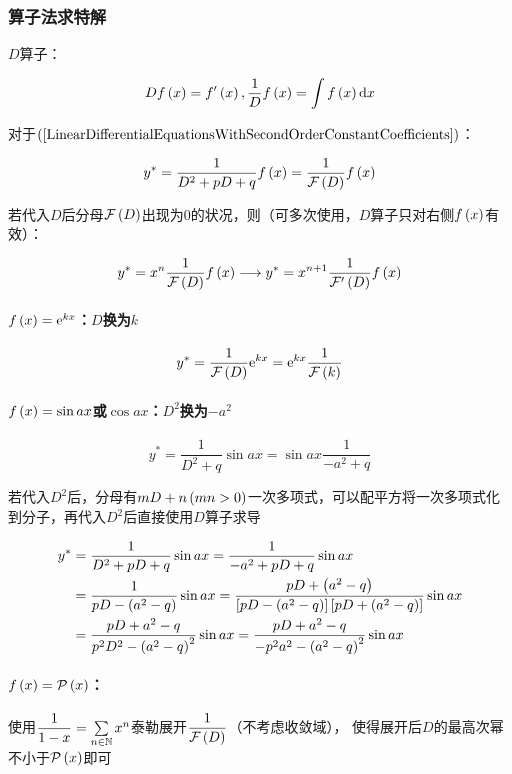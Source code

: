 \documentclass{article}
\begin{document}
\subsubsection{算子法求特解}

$D$算子：

\[Df\left(x\right)=f^\prime\left(x\right),\frac1Df\left(x\right)=\int f\left(x\right)\mathrm d x\]

对于$\left(\ref{LinearDifferentialEquationsWithSecondOrderConstantCoefficients}\right)$：

\[y^*=\frac1{D^2+pD+q}f\left(x\right)=\frac1{\mathcal F\left(D\right)}f\left(x\right)\]

若代入$D$后分母$\mathcal F\left(D\right)$出现为$0$的状况，则（可多次使用，$D$算子只对右侧$f\left(x\right)$有效）：

\[y^*=x^n\frac1{\mathcal F\left(D\right)}f\left(x\right)\longrightarrow y^*=x^{n+1}\frac1{\mathcal F^\prime\left(D\right)}f\left(x\right)\]

\paragraph{$f\left(x\right)=\mathrm e^{kx}$：$D$换为$k$}

\[y^*=\frac1{\mathcal F\left(D\right)}\mathrm e^{kx}=\mathrm e^{kx}\frac1{\mathcal F\left(k\right)}\]

\paragraph{$f\left(x\right)=\sin ax$或$\cos ax$：$D^2$换为$-a^2$}

\[y^*=\frac1{D^2+q}\sin ax=\sin ax\frac1{-a^2+q}\]

若代入$D^2$后，分母有$mD+n\left(mn>0\right)$一次多项式，可以配平方将一次多项式化到分子，再代入$D^2$后直接使用$D$算子求导

\[\begin{aligned}
        y^* & =\frac1{D^2+pD+q}\sin ax=\frac1{-a^2+pD+q}\sin ax                                           \\
            & =\frac1{pD-\left(a^2-q\right)}\sin ax=\frac{pD+\left(a^2-q\right)}{\left[pD-\left(a^2-q\right)\right]\left[pD+\left(a^2-q\right)\right]}\sin ax \\
            & =\frac{pD+a^2-q}{p^2D^2-\left(a^2-q\right)^2}\sin ax=\frac{pD+a^2-q}{-p^2a^2-\left(a^2-q\right)^2}\sin ax
    \end{aligned}\]

\paragraph{$f\left(x\right)=\mathcal P\left(x\right)$：}

使用$\dfrac1{1-x}=\sum\limits_{n\in\mathbb N}x^n$泰勒展开$\dfrac1{\mathcal F\left(D\right)}$（不考虑收敛域），
使得展开后$D$的最高次幂不小于$\mathcal P\left(x\right)$即可
\end{document}
